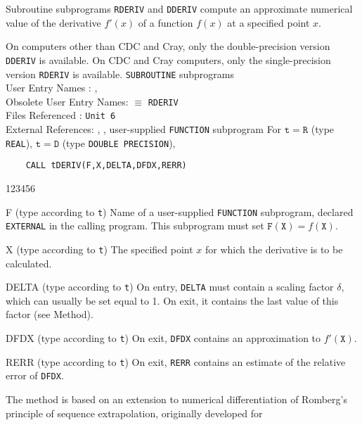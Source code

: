                           
                 
\Submitter{}                             
                   
Subroutine subprograms {\tt RDERIV}  and {\tt DDERIV} compute an
approximate numerical value of the derivative $f'(x)$ of a function
$f(x)$ at a specified point $x$.
\par
On computers other than CDC and Cray, only the double-precision version
{\tt DDERIV} is available. On CDC and Cray computers,
only the single-precision version {\tt RDERIV} is available.
\Structure
{\tt SUBROUTINE} subprograms \\
User Entry Names : , \\
Obsolete User Entry Names:  $\equiv$ {\tt RDERIV} \\
Files  Referenced : {\tt Unit 6} \\
External References: , ,
user-supplied {\tt FUNCTION} subprogram
\Usage
For $\mathtt{t=R}$ (type {\tt REAL}), $\mathtt{t=D}$ (type
{\tt DOUBLE PRECISION}),
\begin{verbatim}
    CALL tDERIV(F,X,DELTA,DFDX,RERR)
\end{verbatim}
\begin{DLtt}{123456}
\item[F] (type according to {\tt t}) Name of a user-supplied
{\tt FUNCTION} subprogram, declared {\tt EXTERNAL} in the calling
program. This subprogram must set $\mathtt{F(X)} = f(\mathtt{X})$.
\item[X] (type according to {\tt t}) The specified point $x$ for
which the derivative is to be calculated.
\item[DELTA] (type according to {\tt t}) On entry, {\tt DELTA} must
contain a scaling factor $\delta$, which can usually be set equal to 1.
On exit, it contains the last value of this factor (see Method).
\item[DFDX] (type according to {\tt t}) On exit, {\tt DFDX}
contains an approximation to $f'(\mathtt{X})$.
\item[RERR] (type according to {\tt t}) On exit, {\tt RERR} contains
an estimate of the relative error of {\tt DFDX}.
\end{DLtt}
\Method
The method is based on an extension to numerical differentiation of
Romberg's principle of sequence extrapolation, originally developed for
